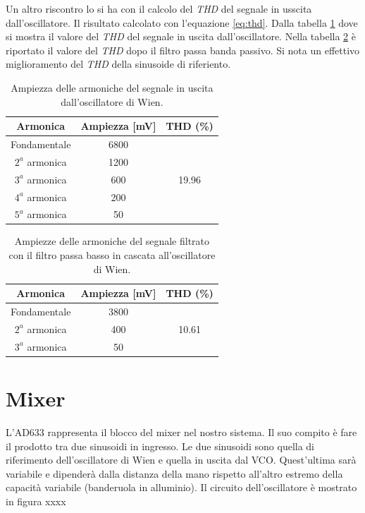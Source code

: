 \documentclass[titlepage]{report}
\begin{document}
	Un altro riscontro lo si ha con il calcolo del \textit{THD} del segnale in usscita dall'oscillatore. Il risultato calcolato con l'equazione \ref{eq:thd}. Dalla tabella \ref{tab:THD_WIEN} dove si mostra il valore del \textit{THD} del segnale in uscita dall'oscillatore. Nella tabella \ref{tab:THD_WIEN+LP} è riportato il valore del \textit{THD} dopo il filtro passa banda passivo. Si nota un effettivo miglioramento del \textit{THD} della sinusoide di riferiento.

	\begin{table}[h!]
		\centering
		\begin{tabular}{||c|c|c||}
			\hline
			\cellcolor{gray!10}Armonica & \cellcolor{gray!10}Ampiezza [mV] & \cellcolor{gray!10}THD (\%) \\
			\hline
			Fondamentale & 6800 &\\
			\cline{1-2}
			$2^a$ armonica & 1200 & \\
			\cline{1-2} 
			$3^a$ armonica & 600 & 19.96 \\
			\cline{1-2} 
			$4^a$ armonica & 200 & \\
			\cline{1-2} 
			$5^a$ armonica & 50 & \\
			\hline	
		\end{tabular}
		\caption{Ampiezza delle armoniche del segnale in uscita dall'oscillatore di Wien.}
		\label{tab:THD_WIEN}
	\end{table}

	\begin{table}[h!]
		\centering
		\begin{tabular}{||c|c|c||}
			\hline
			\cellcolor{gray!10}Armonica & \cellcolor{gray!10}Ampiezza [mV] & \cellcolor{gray!10}THD (\%) \\
			\hline
			Fondamentale & 3800 &\\
			\cline{1-2}
			$2^a$ armonica & 400 & 10.61 \\
			\cline{1-2} 
			$3^a$ armonica & 50 & \\
			\hline	
		\end{tabular}
		\caption{Ampiezze delle armoniche del segnale filtrato con il filtro passa basso in cascata all'oscillatore di Wien.}
		\label{tab:THD_WIEN+LP}
	\end{table}

\section{Mixer}
\label{sec:Mixer}


L'AD633 rappresenta il blocco del mixer nel nostro sistema. Il suo compito è fare il prodotto tra due sinusoidi in ingresso. Le due sinusoidi sono quella di riferimento dell'oscillatore di Wien e quella in uscita dal VCO. Quest'ultima sarà variabile e dipenderà dalla distanza della mano rispetto all'altro estremo della capacità variabile (banderuola in alluminio). Il circuito dell'oscillatore è mostrato in figura xxxx
\end{document}
